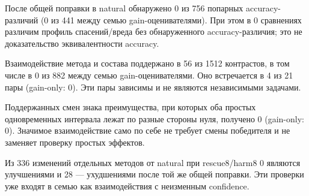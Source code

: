 После общей поправки в natural обнаружено 0 из 756 попарных accuracy-различий (0 из 441 между семью gain-оценивателями). При этом в 0 сравнениях различим профиль спасений/вреда без обнаруженного accuracy-различия; это не доказательство эквивалентности accuracy.

Взаимодействие метода и состава поддержано в 56 из 1512 контрастов, в том числе в 0 из 882 между семью gain-оценивателями. Оно встречается в 4 из 21 пары (gain-only: 0). Эти пары зависимы и не являются независимыми задачами.

Поддержанных смен знака преимущества, при которых оба простых одновременных интервала лежат по разные стороны нуля, получено 0 (gain-only: 0). Значимое взаимодействие само по себе не требует смены победителя и не заменяет проверку простых эффектов.

Из 336 изменений отдельных методов от natural при rescue8/harm8 0 являются улучшениями и 28 --- ухудшениями после той же общей поправки. Эти проверки уже входят в семью как взаимодействия с неизменным confidence.
